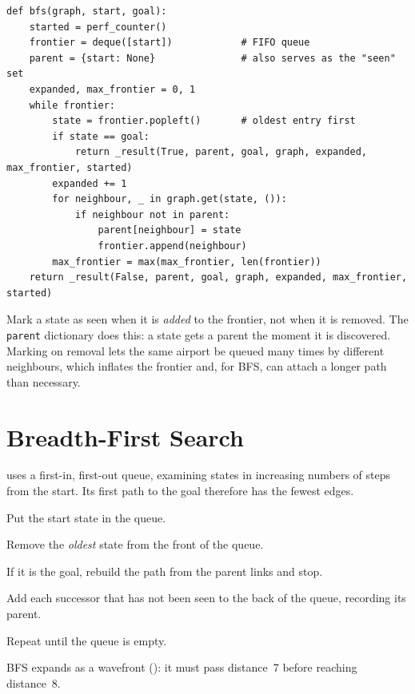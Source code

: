 \begin{lstlisting}[style=aipython]
def bfs(graph, start, goal):
    started = perf_counter()
    frontier = deque([start])            # FIFO queue
    parent = {start: None}               # also serves as the "seen" set
    expanded, max_frontier = 0, 1
    while frontier:
        state = frontier.popleft()       # oldest entry first
        if state == goal:
            return _result(True, parent, goal, graph, expanded, max_frontier, started)
        expanded += 1
        for neighbour, _ in graph.get(state, ()):
            if neighbour not in parent:
                parent[neighbour] = state
                frontier.append(neighbour)
        max_frontier = max(max_frontier, len(frontier))
    return _result(False, parent, goal, graph, expanded, max_frontier, started)
\end{lstlisting}

\begin{pitfall}
Mark a state as seen when it is \emph{added} to the frontier, not when it is removed. The \texttt{parent} dictionary does this: a state gets a parent the moment it is discovered. Marking on removal lets the same airport be queued many times by different neighbours, which inflates the frontier and, for BFS, can attach a longer path than necessary.
\end{pitfall}

\section{Breadth-First Search}

 uses a first-in, first-out queue, examining states in increasing numbers of steps from the start. Its first path to the goal therefore has the fewest edges.

\begin{mlsteps}
  \item Put the start state in the queue.
  \item Remove the \emph{oldest} state from the front of the queue.
  \item If it is the goal, rebuild the path from the parent links and stop.
  \item Add each successor that has not been seen to the back of the queue, recording its parent.
  \item Repeat until the queue is empty.
\end{mlsteps}

BFS expands as a wavefront (): it must pass distance~7 before reaching distance~8.

